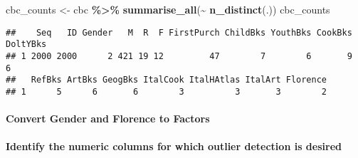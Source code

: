 \documentclass[
]{article}
\newenvironment{Shaded}{\begin{snugshade}}{\end{snugshade}}
\newcommand{\AttributeTok}[1]{\textcolor[rgb]{0.13,0.29,0.53}{#1}}
\newcommand{\DecValTok}[1]{\textcolor[rgb]{0.00,0.00,0.81}{#1}}
\newcommand{\FunctionTok}[1]{\textcolor[rgb]{0.13,0.29,0.53}{\textbf{#1}}}
\newcommand{\NormalTok}[1]{#1}
\newcommand{\OtherTok}[1]{\textcolor[rgb]{0.56,0.35,0.01}{#1}}
\newcommand{\SpecialCharTok}[1]{\textcolor[rgb]{0.81,0.36,0.00}{\textbf{#1}}}
\newcommand{\StringTok}[1]{\textcolor[rgb]{0.31,0.60,0.02}{#1}}
\begin{document}
\begin{Shaded}
\begin{Highlighting}[]
\NormalTok{cbc\_counts }\OtherTok{\textless{}{-}}\NormalTok{ cbc }\SpecialCharTok{\%\textgreater{}\%} \FunctionTok{summarise\_all}\NormalTok{(}\SpecialCharTok{\textasciitilde{}} \FunctionTok{n\_distinct}\NormalTok{(.))}
\NormalTok{cbc\_counts}
\end{Highlighting}
\end{Shaded}

\begin{verbatim}
##    Seq   ID Gender   M  R  F FirstPurch ChildBks YouthBks CookBks DoltYBks
## 1 2000 2000      2 421 19 12         47        7        6       9        6
##   RefBks ArtBks GeogBks ItalCook ItalHAtlas ItalArt Florence
## 1      5      6       6        3          3       3        2
\end{verbatim}

\paragraph{Convert Gender and Florence to
Factors}\label{convert-gender-and-florence-to-factors}

\begin{Shaded}
\end{Shaded}

\paragraph{Identify the numeric columns for which outlier detection is
desired}\label{identify-the-numeric-columns-for-which-outlier-detection-is-desired}
\end{document}
